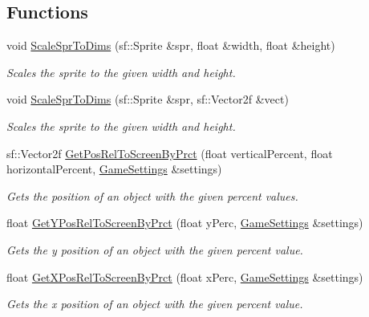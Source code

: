 \subsection*{Functions}
\begin{DoxyCompactItemize}
\item 
void \mbox{\hyperlink{namespace_arktis_engine_aee0d0d24a793b5dc52aac529a577a264}{Scale\+Spr\+To\+Dims}} (sf\+::\+Sprite \&spr, float \&width, float \&height)
\begin{DoxyCompactList}\small\item\em Scales the sprite to the given width and height. \end{DoxyCompactList}\item 
void \mbox{\hyperlink{namespace_arktis_engine_a72b7a00fd36289b3ff3c3f9f552af46e}{Scale\+Spr\+To\+Dims}} (sf\+::\+Sprite \&spr, sf\+::\+Vector2f \&vect)
\begin{DoxyCompactList}\small\item\em Scales the sprite to the given width and height. \end{DoxyCompactList}\item 
sf\+::\+Vector2f \mbox{\hyperlink{namespace_arktis_engine_a45a3fbfd96555f84d94f59fae3de85cf}{Get\+Pos\+Rel\+To\+Screen\+By\+Prct}} (float vertical\+Percent, float horizontal\+Percent, \mbox{\hyperlink{struct_arktis_engine_1_1_game_settings}{Game\+Settings}} \&settings)
\begin{DoxyCompactList}\small\item\em Gets the position of an object with the given percent values. \end{DoxyCompactList}\item 
float \mbox{\hyperlink{namespace_arktis_engine_aa7101d84beded8cfc89a1b005f3b1f2a}{Get\+Y\+Pos\+Rel\+To\+Screen\+By\+Prct}} (float y\+Perc, \mbox{\hyperlink{struct_arktis_engine_1_1_game_settings}{Game\+Settings}} \&settings)
\begin{DoxyCompactList}\small\item\em Gets the y position of an object with the given percent value. \end{DoxyCompactList}\item 
float \mbox{\hyperlink{namespace_arktis_engine_a54f4502a1f55549659262906688ea821}{Get\+X\+Pos\+Rel\+To\+Screen\+By\+Prct}} (float x\+Perc, \mbox{\hyperlink{struct_arktis_engine_1_1_game_settings}{Game\+Settings}} \&settings)
\begin{DoxyCompactList}\small\item\em Gets the x position of an object with the given percent value. \end{DoxyCompactList}\item 

\end{DoxyCompactItemize}
